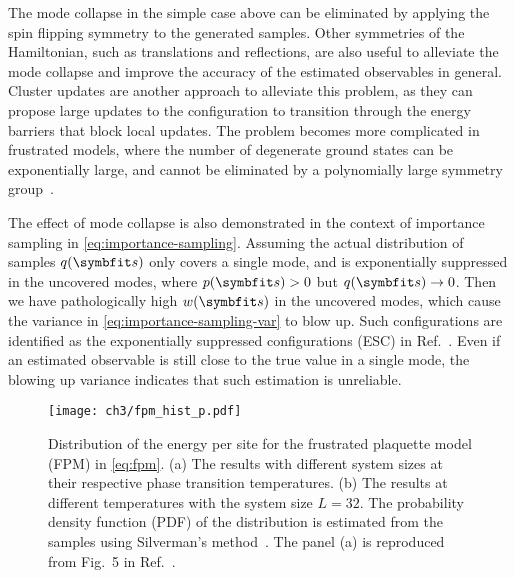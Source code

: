 The mode collapse in the simple case above can be eliminated by applying the spin flipping symmetry to the generated samples. Other symmetries of the Hamiltonian, such as translations and reflections, are also useful to alleviate the mode collapse and improve the accuracy of the estimated observables in general. Cluster updates are another approach to alleviate this problem, as they can propose large updates to the configuration to transition through the energy barriers that block local updates. The problem becomes more complicated in frustrated models, where the number of degenerate ground states can be exponentially large, and cannot be eliminated by a polynomially large symmetry group~\cite{wannier1950antiferromagnetism, mambrini1999residual, vanderstraeten2018residual}.

The effect of mode collapse is also demonstrated in the context of importance sampling in \cref{eq:importance-sampling}. Assuming the actual distribution of samples $q(\vs)$ only covers a single mode, and is exponentially suppressed in the uncovered modes, where $p(\vs) > 0$ but $q(\vs) \to 0$. Then we have pathologically high $w(\vs)$ in the uncovered modes, which cause the variance in \cref{eq:importance-sampling-var} to blow up. Such configurations are identified as the exponentially suppressed configurations (ESC) in Ref.~\cite{wu2021unbiased}. Even if an estimated observable is still close to the true value in a single mode, the blowing up variance indicates that such estimation is unreliable.

\begin{figure}[htb]
\centering
\texttt{[image: ch3/fpm\_hist\_p.pdf]}
\caption[Distribution of energy for frustrated plaquette model]{
Distribution of the energy per site for the frustrated plaquette model (FPM) in \cref{eq:fpm}.
(a) The results with different system sizes at their respective phase transition temperatures.
(b) The results at different temperatures with the system size $L = 32$.
The probability density function (PDF) of the distribution is estimated from the samples using Silverman’s method~\cite{silverman1986density}.
The panel (a) is reproduced from Fig.~5 in Ref.~\cite{wu2021unbiased}.
}
\label{fig:fpm-hist-p}
\end{figure}


